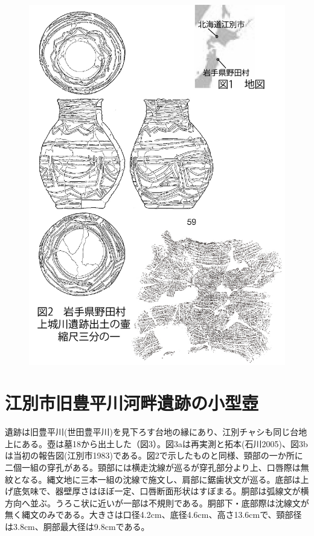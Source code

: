 \documentclass[a4j,11pt,twocolumn,openany]{jsbook}
\begin{document}
\begin{figure}[ht]
	\centering
	\includegraphics[width=\linewidth]{fig/03_Otaishi/01_otaishi.jpg}
	\label{}
	\vspace{-2\baselineskip}
\end{figure}

\section{江別市旧豊平川河畔遺跡の小型壺}
遺跡は旧豊平川(世田豊平川)を見下ろす台地の縁にあり、江別チャシも同じ台地上にある。壺は墓18から出土した（図3）。図3aは再実測と拓本(石川2005)、図3bは当初の報告図(江別市1983)である。図2で示したものと同様、頸部の一か所に二個一組の穿孔がある。頸部には横走沈線が巡るが穿孔部分より上、口唇際は無紋となる。縄文地に三本一組の沈線で施文し、肩部に鋸歯状文が巡る。底部は上げ底気味で、器壁厚さはほぼ一定、口唇断面形状はすぼまる。胴部は弧線文が横方向へ並ぶ。うろこ状に近いが一部は不規則である。胴部下・底部際は沈線文が無く縄文のみである。大きさは口径4.2cm、底径4.6cm、高さ13.6cmで、頸部径は3.8cm、胴部最大径は9.8cmである。
\end{document}
